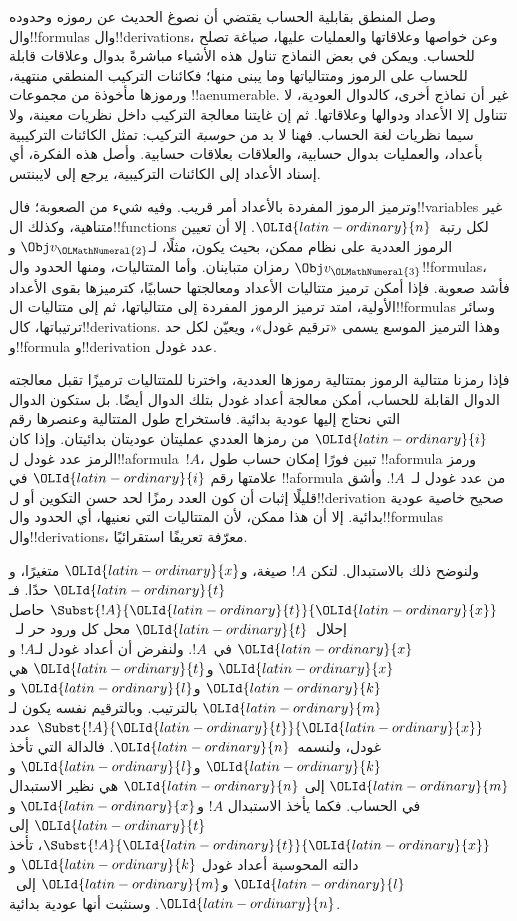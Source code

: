 \documentclass[../../../include/open-logic-section]{subfiles}
\begin{document}

وصل المنطق بقابلية الحساب يقتضي أن نصوغ الحديث
عن رموزه وحدوده وال!!{formula}s وال!!{derivation}s،
وعن خواصها وعلاقاتها والعمليات عليها، صياغة تصلح
للحساب. ويمكن في بعض النماذج تناول هذه الأشياء
مباشرةً بدوال وعلاقات قابلة للحساب على الرموز
ومتتالياتها وما يبنى منها؛ فكائنات التركيب
المنطقي منتهية، ورموزها مأخوذة من مجموعات
!!a{enumerable}. غير أن نماذج أخرى، كالدوال
العودية، لا تتناول إلا الأعداد ودوالها وعلاقاتها.
ثم إن غايتنا معالجة التركيب داخل نظريات معينة،
ولا سيما نظريات لغة الحساب. فهنا لا بد من
\emph{حوسبة} التركيب: تمثل الكائنات التركيبية
بأعداد، والعمليات بدوال حسابية، والعلاقات
بعلاقات حسابية. وأصل هذه الفكرة، أي إسناد
الأعداد إلى الكائنات التركيبية، يرجع إلى لايبنتس.

وترميز الرموز المفردة بالأعداد أمر قريب.
وفيه شيء من الصعوبة؛ فال!!{variable}s غير
متناهية، وكذلك ال!!{function}s لكل رتبة~$\OLId{latin-ordinary}{n}$.
إلا أن تعيين الرموز العددية على نظام ممكن،
بحيث يكون، مثلًا، لـ$\Obj v_\OLMathNumeral{2}$ و$\Obj v_\OLMathNumeral{3}$
رمزان متباينان. وأما المتتاليات، ومنها الحدود
وال!!{formula}s، فأشد صعوبة. فإذا أمكن
ترميز متتاليات الأعداد ومعالجتها حسابيًا،
كترميزها بقوى الأعداد الأولية، امتد ترميز
الرموز المفردة إلى متتالياتها، ثم إلى
متتاليات ال!!{formula}s وسائر ترتيباتها،
كال!!{derivation}s. وهذا الترميز الموسع
يسمى «ترقيم غودل»، ويعيّن لكل حد
و!!{formula} و!!{derivation} عدد غودل.

فإذا رمزنا متتالية الرموز بمتتالية رموزها العددية،
واخترنا للمتتاليات ترميزًا تقبل معالجته الدوال
القابلة للحساب، أمكن معالجة أعداد غودل
بتلك الدوال أيضًا. بل ستكون الدوال التي
نحتاج إليها عودية بدائية. فاستخراج طول
المتتالية وعنصرها رقم $\OLId{latin-ordinary}{i}$ من رمزها العددي
عمليتان عوديتان بدائيتان. وإذا كان الرمز
عدد غودل ل!!a{formula}~$!A$، تبين فورًا
إمكان حساب طول !!a{formula} ورمز علامتها
رقم $\OLId{latin-ordinary}{i}$ في !!a{formula} من عدد غودل لـ~$!A$.
وأشق قليلًا إثبات أن كون العدد رمزًا لحد
حسن التكوين أو ل!!{derivation} صحيح خاصية
عودية بدائية. إلا أن هذا ممكن، لأن
المتتاليات التي نعنيها، أي الحدود
وال!!{formula}s وال!!{derivation}s،
معرّفة تعريفًا استقرائيًا.

ولنوضح ذلك بالاستبدال. لتكن $!A$ صيغة،
و$\OLId{latin-ordinary}{x}$ متغيرًا، و$\OLId{latin-ordinary}{t}$ حدًا. فـ$\Subst{!A}{\OLId{latin-ordinary}{t}}{\OLId{latin-ordinary}{x}}$
حاصل إحلال~$\OLId{latin-ordinary}{t}$ محل كل ورود حر لـ~$\OLId{latin-ordinary}{x}$
في~$!A$. ولنفرض أن أعداد غودل لـ$!A$
و$\OLId{latin-ordinary}{x}$ و$\OLId{latin-ordinary}{t}$ هي $\OLId{latin-ordinary}{k}$ و$\OLId{latin-ordinary}{l}$ و$\OLId{latin-ordinary}{m}$ بالترتيب.
وبالترقيم نفسه يكون لـ$\Subst{!A}{\OLId{latin-ordinary}{t}}{\OLId{latin-ordinary}{x}}$
عدد غودل، ولنسمه~$\OLId{latin-ordinary}{n}$. فالدالة التي تأخذ
$\OLId{latin-ordinary}{k}$ و$\OLId{latin-ordinary}{l}$ و$\OLId{latin-ordinary}{m}$ إلى $\OLId{latin-ordinary}{n}$ هي نظير الاستبدال
في الحساب. فكما يأخذ الاستبدال $!A$
و$\OLId{latin-ordinary}{x}$ و$\OLId{latin-ordinary}{t}$ إلى $\Subst{!A}{\OLId{latin-ordinary}{t}}{\OLId{latin-ordinary}{x}}$،
تأخذ دالته المحوسبة أعداد غودل $\OLId{latin-ordinary}{k}$
و$\OLId{latin-ordinary}{l}$ و$\OLId{latin-ordinary}{m}$ إلى~$\OLId{latin-ordinary}{n}$. وسنثبت أنها عودية بدائية.
\end{document}
